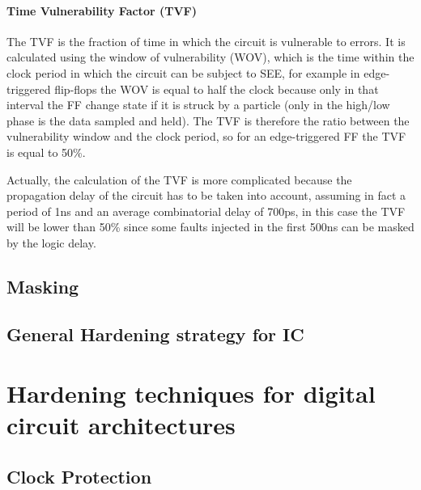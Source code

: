 {{{			\paragraph{Time Vulnerability Factor (TVF)}{
				The TVF is the fraction of time in which the circuit is vulnerable to errors. It is calculated using the window of vulnerability (WOV), which is the time within the clock period in which the circuit can be subject to SEE, for example in edge-triggered flip-flops the WOV is equal to half the clock because only in that interval the FF change state if it is struck by a particle (only in the high/low phase is the data sampled and held). The TVF is therefore the ratio between the vulnerability window and the clock period, so for an edge-triggered FF the TVF is equal to 50\%. 
				
				Actually, the calculation of the TVF is more complicated because the propagation delay of the circuit has to be taken into account, assuming in fact a period of 1ns and an average combinatorial delay of 700ps, in this case the TVF will be lower than 50\% since some faults injected in the first 500ns can be masked by the logic delay.
			}
				
			
		}%
		\newpage
		\subsection{Masking}{
			
			
		}%
	
		\subsection{General Hardening strategy for IC}{
		}%

		
	}%
	\section{Hardening techniques for digital circuit architectures}{
		\subsection{Clock Protection}{
			
}}}
